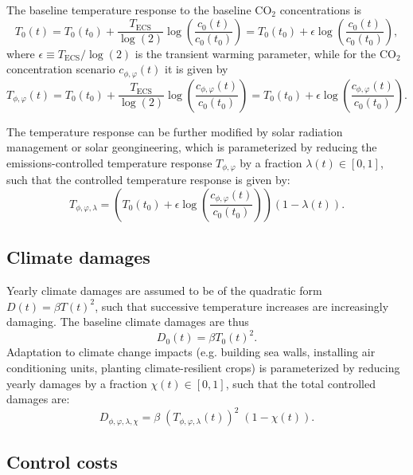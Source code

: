 \documentclass{article}
\begin{document}
The baseline temperature response to the baseline CO$_{2}$ concentrations is 
\begin{equation}
    T_{0}(t) = 
    T_{0}(t_{0}) + 
    \frac{T_{\text{ECS}}}{\log(2)} \log(\frac{c_{0}(t)}{c_{0}(t_{0})}) = 
    T_{0}(t_{0}) + 
    \epsilon \log(\frac{c_{0}(t)}{c_{0}(t_{0})}),
\end{equation}
where $\epsilon \equiv T_{\text{ECS}} / \log(2)$ is the transient warming parameter, while for the CO$_{2}$ concentration scenario $c_{\phi,\varphi}(t)$ it is given by
\begin{equation}
    T_{\phi,\varphi}(t) =
    T_{0}(t_{0}) + 
    \frac{T_{\text{ECS}}}{\log(2)} \log(\frac{c_{\phi,\varphi}(t)}{c_{0}(t_{0})}) = 
    T_{0}(t_{0}) + 
    \epsilon \log(\frac{c_{\phi,\varphi}(t)}{c_{0}(t_{0})}).
\end{equation}


The temperature response can be further modified by solar radiation management or solar geongineering, which is parameterized by reducing the emissions-controlled temperature response $T_{\phi,\varphi}$ by a fraction $\lambda(t) \in [0,1]$, such that the controlled temperature response is given by:
\begin{equation}
    T_{\phi, \varphi, \lambda} = \left(
    T_{0}(t_{0}) + 
    \epsilon \log(\frac{c_{\phi,\varphi}(t)}{c_{0}(t_{0})}) 
    \right) (1 - \lambda(t)).
\end{equation}

\subsection{Climate damages}

Yearly climate damages are assumed to be of the quadratic form $D(t) = \beta T(t)^{2}$, such that successive temperature increases are increasingly damaging. The baseline climate damages are thus
\begin{equation}
    D_{0}(t) = \beta T_{0}(t)^{2}.
\end{equation}
Adaptation to climate change impacts (e.g. building sea walls, installing air conditioning units, planting climate-resilient crops) is parameterized by reducing yearly damages by a fraction $\chi(t) \in [0,1]$, such that the total controlled damages are:
\begin{equation}
    D_{\phi, \varphi, \lambda, \chi} = \beta \; (T_{\phi, \varphi, \lambda}(t))^{2} \; (1-\chi(t)).
\end{equation}

\subsection{Control costs}
\end{document}
